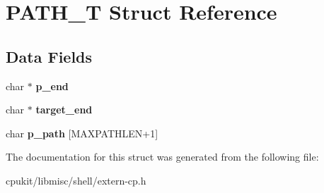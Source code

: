 \hypertarget{structPATH__T}{}\section{P\+A\+T\+H\+\_\+T Struct Reference}
\label{structPATH__T}
\subsection*{Data Fields}
\begin{DoxyCompactItemize}
\item 
\mbox{\label{structPATH__T_a3fb4a16f04af496fceef79340793ece2}} 
char $\ast$ {\bfseries p\+\_\+end}
\item 
\mbox{\label{structPATH__T_ad8b2727173d3d5447b63771b9ba7aa43}} 
char $\ast$ {\bfseries target\+\_\+end}
\item 
\mbox{\label{structPATH__T_a6e1be31c50a81dbf7f29bc02662c0943}} 
char {\bfseries p\+\_\+path} \mbox{[}M\+A\+X\+P\+A\+T\+H\+L\+EN+1\mbox{]}
\end{DoxyCompactItemize}


The documentation for this struct was generated from the following file\+:\begin{DoxyCompactItemize}
\item 
cpukit/libmisc/shell/extern-\/cp.\+h\end{DoxyCompactItemize}
